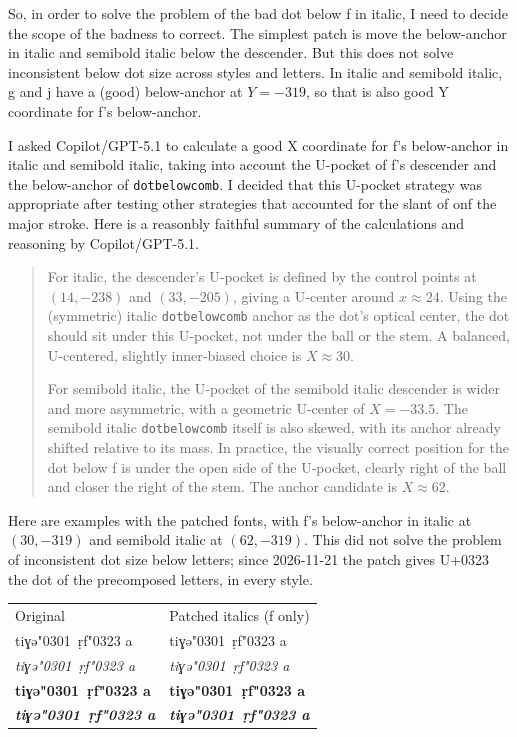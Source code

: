\documentclass[landscape]{article}
\begin{document}
So, in order to solve the problem of the bad dot below f in italic, I need to decide the scope of the badness to correct. 
The simplest patch is move the below-anchor in italic and semibold italic below the descender.
But this does not solve inconsistent below dot size across styles and letters.
In italic and semibold italic, g and j have a (good) below-anchor at $Y = -319$, so that is also good Y coordinate for f's below-anchor.

I asked Copilot/GPT-5.1 to calculate a good X coordinate for f's below-anchor in italic and semibold italic, taking into account the U-pocket of f's descender and the below-anchor of \verb|dotbelowcomb|. 
I decided that this U-pocket strategy was appropriate after testing other strategies that accounted for the slant of onf the major stroke.
Here is a reasonbly faithful summary of the calculations and reasoning by Copilot/GPT-5.1.

\begin{quote}
	For italic, the descender’s U‑pocket is defined by the control points at $(14,-238)$ and $(33,-205)$, giving a U‑center around $x \approx 24$. Using the (symmetric) italic \verb|dotbelowcomb| anchor as the dot’s optical center, the dot should sit under this U‑pocket, not under the ball or the stem. A balanced, U‑centered, slightly inner‑biased choice is $X \approx 30$.
	
	For semibold italic, the U‑pocket of the semibold italic descender is wider and more asymmetric, with a geometric U-center of $X = -33.5$. The semibold italic \verb|dotbelowcomb| itself is also skewed, with its anchor already shifted relative to its mass. In practice, the visually correct position for the dot below f is under the open side of the U‑pocket, clearly right of the ball and closer the right of the stem. The anchor candidate is $X \approx 62$.
\end{quote}

Here are examples with the patched fonts, with f's below-anchor in italic at $(30,-319)$ and semibold italic at $(62,-319)$. This did not solve the problem of inconsistent dot size below letters; since 2026-11-21 the patch gives U+0323 the dot of the precomposed letters, in every style.

\begin{tabular}{ll}
	Original & Patched italics (f only)\\
	tiɣə\char"0301\ ṛf\char"0323 a & tiɣə\char"0301\ ṛf\char"0323 a\\
	{\itshape tiɣə\char"0301\ ṛf\char"0323 a} & {\LibertinusSerifPatch \itshape tiɣə\char"0301\ ṛf\char"0323 a}\\
	{\bfseries tiɣə\char"0301\ ṛf\char"0323 a} & {\bfseries tiɣə\char"0301\ ṛf\char"0323 a}\\
	{\bfseries\itshape tiɣə\char"0301\ ṛf\char"0323 a} & {\LibertinusSerifPatch \itshape \bfseries tiɣə\char"0301\ ṛf\char"0323 a}
\end{tabular}
\end{document}
